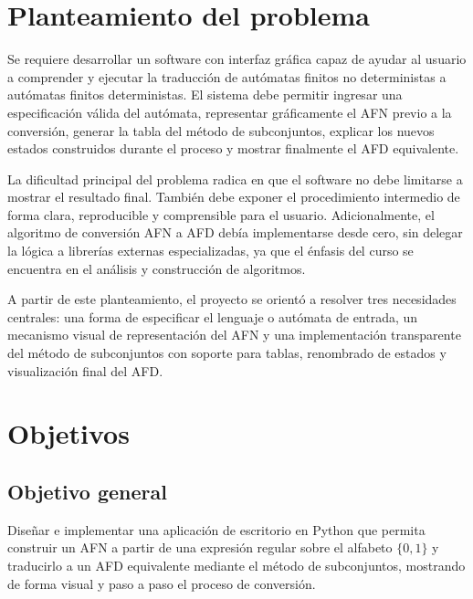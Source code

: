 \documentclass[12pt]{article}
\begin{document}
\section{Planteamiento del problema}

Se requiere desarrollar un software con interfaz gráfica capaz de ayudar al usuario a comprender y ejecutar la traducción de autómatas finitos no deterministas a autómatas finitos deterministas. El sistema debe permitir ingresar una especificación válida del autómata, representar gráficamente el AFN previo a la conversión, generar la tabla del método de subconjuntos, explicar los nuevos estados construidos durante el proceso y mostrar finalmente el AFD equivalente.

La dificultad principal del problema radica en que el software no debe limitarse a mostrar el resultado final. También debe exponer el procedimiento intermedio de forma clara, reproducible y comprensible para el usuario. Adicionalmente, el algoritmo de conversión AFN a AFD debía implementarse desde cero, sin delegar la lógica a librerías externas especializadas, ya que el énfasis del curso se encuentra en el análisis y construcción de algoritmos.

A partir de este planteamiento, el proyecto se orientó a resolver tres necesidades centrales: una forma de especificar el lenguaje o autómata de entrada, un mecanismo visual de representación del AFN y una implementación transparente del método de subconjuntos con soporte para tablas, renombrado de estados y visualización final del AFD.

\section{Objetivos}

\subsection{Objetivo general}

Diseñar e implementar una aplicación de escritorio en Python que permita construir un AFN a partir de una expresión regular sobre el alfabeto $\{0,1\}$ y traducirlo a un AFD equivalente mediante el método de subconjuntos, mostrando de forma visual y paso a paso el proceso de conversión.
\end{document}
